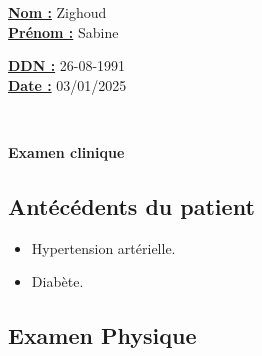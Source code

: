 \documentclass[12pt,a4paper]{article}%
\begin{document}
%
\normalsize%
\begin{minipage}{0.5\linewidth}%
\textbf{\underline{Nom :}} \hspace{1cm} Zighoud%
\\%
\textbf{\underline{Prénom :}} \hspace{1cm} Sabine%
\\%
\end{minipage}%
\begin{minipage}{0.5\linewidth}%
\textbf{\underline{DDN :}} \hspace{1cm} 26-08-1991%
\\%
\textbf{\underline{Date :}} \hspace{1cm} 03/01/2025%
\\%
\end{minipage}%
\hspace{\textwidth}%
\\%
\begin{center}%

        \begin{tcolorbox}[
            colframe=main_title_border_color,        %
            colback=main_title_background_color,        %
            coltitle=main_title_border_color,       %
            arc=8pt,              %
            boxrule=0.5mm,          %
            auto outer arc,       %
            width=\linewidth,     %
            halign=center         %
        ]
        \LARGE{\textbf{Examen clinique}}
        \end{tcolorbox}
\end{center}%
%
\vspace*{\baselineskip}%
%
\vspace*{\baselineskip}%
\subsection*{Antécédents du patient}%
\label{subsec:Antcdentsdupatient}%

%
\begin{itemize}%
\setlength{\itemsep}{0pt}%
\item%
Hypertension artérielle.%
\item%
Diabète.%
\end{itemize}%
\subsection*{Examen Physique}%
\label{subsec:ExamenPhysique}%
\end{document}
